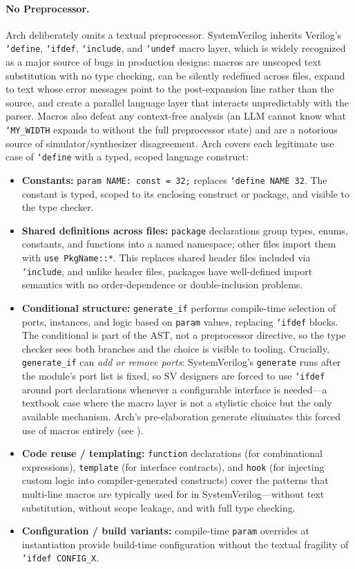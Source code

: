 \documentclass[11pt,twocolumn]{article}
\begin{document}
\paragraph{No Preprocessor.} Arch deliberately omits a textual preprocessor. SystemVerilog inherits Verilog's \texttt{`define}, \texttt{`ifdef}, \texttt{`include}, and \texttt{`undef} macro layer, which is widely recognized as a major source of bugs in production designs: macros are unscoped text substitution with no type checking, can be silently redefined across files, expand to text whose error messages point to the post-expansion line rather than the source, and create a parallel language layer that interacts unpredictably with the parser. Macros also defeat any context-free analysis (an LLM cannot know what \texttt{`MY\_WIDTH} expands to without the full preprocessor state) and are a notorious source of simulator/synthesizer disagreement. Arch covers each legitimate use case of \texttt{`define} with a typed, scoped language construct:

\begin{itemize}
\item \textbf{Constants:} \texttt{param NAME: const = 32;} replaces \texttt{`define NAME 32}. The constant is typed, scoped to its enclosing construct or package, and visible to the type checker.
\item \textbf{Shared definitions across files:} \texttt{package} declarations group types, enums, constants, and functions into a named namespace; other files import them with \texttt{use PkgName::*}. This replaces shared header files included via \texttt{`include}, and unlike header files, packages have well-defined import semantics with no order-dependence or double-inclusion problems.
\item \textbf{Conditional structure:} \texttt{generate\_if} performs compile-time selection of ports, instances, and logic based on \texttt{param} values, replacing \texttt{`ifdef} blocks. The conditional is part of the AST, not a preprocessor directive, so the type checker sees both branches and the choice is visible to tooling. Crucially, \texttt{generate\_if} can \emph{add or remove ports}: SystemVerilog's \texttt{generate} runs after the module's port list is fixed, so SV designers are forced to use \texttt{`ifdef} around port declarations whenever a configurable interface is needed---a textbook case where the macro layer is not a stylistic choice but the only available mechanism. Arch's pre-elaboration generate eliminates this forced use of macros entirely (see ).
\item \textbf{Code reuse / templating:} \texttt{function} declarations (for combinational expressions), \texttt{template} (for interface contracts), and \texttt{hook} (for injecting custom logic into compiler-generated constructs) cover the patterns that multi-line macros are typically used for in SystemVerilog---without text substitution, without scope leakage, and with full type checking.
\item \textbf{Configuration / build variants:} compile-time \texttt{param} overrides at instantiation provide build-time configuration without the textual fragility of \texttt{`ifdef CONFIG\_X}.
\end{itemize}
\end{document}
